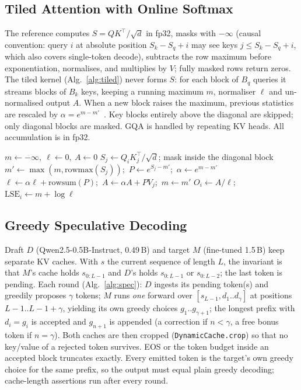 \subsection{Tiled Attention with Online Softmax}\label{sec:attn}
The reference computes $S=QK^\top/\sqrt{d}$ in fp32, masks with $-\infty$ (causal convention: query $i$ at
absolute position $S_k-S_q+i$ may see keys $j\le S_k-S_q+i$, which also covers single-token decode), subtracts the
row maximum before exponentiation, normalises, and multiplies by $V$; fully masked rows return zeros. The
tiled kernel (Alg.~\ref{alg:tiled}) never forms $S$: for each block of $B_q$ queries it streams blocks of $B_k$
keys, keeping a running maximum $m$, normaliser $\ell$ and un-normalised output $A$. When a new block raises
the maximum, previous statistics are rescaled by $\alpha=e^{m-m'}$~\cite{milakov2018online,dao2022flashattention}.
Key blocks entirely above the diagonal are skipped; only diagonal blocks are masked. GQA is handled by
repeating KV heads. All accumulation is in fp32.

\begin{algorithm}[t]
\caption{Tiled attention with online softmax (one query block)}\label{alg:tiled}
\begin{algorithmic}[1]
\State $m\gets-\infty,\ \ell\gets0,\ A\gets0$ 
  \State $S_j\gets Q_iK_j^\top/\sqrt d$; mask inside the diagonal block
  \State $m'\gets\max(m,\mathrm{rowmax}(S_j))$;\ $P\gets e^{S_j-m'}$;\ $\alpha\gets e^{m-m'}$
  \State $\ell\gets\alpha\ell+\mathrm{rowsum}(P)$;\ $A\gets\alpha A+PV_j$;\ $m\gets m'$
\EndFor
\State $O_i\gets A/\ell$;\quad $\mathrm{LSE}_i\gets m+\log\ell$
\end{algorithmic}
\end{algorithm}

\subsection{Greedy Speculative Decoding}\label{sec:spec}
Draft $D$ (Qwen2.5-0.5B-Instruct, 0.49\,B) and target $M$ (fine-tuned 1.5\,B) keep separate KV caches. With
$s$ the current sequence of length $L$, the invariant is that $M$'s cache holds $s_{0:L-1}$ and $D$'s holds
$s_{0:L-1}$ or $s_{0:L-2}$; the last token is pending. Each round (Alg.~\ref{alg:spec}): $D$ ingests its pending
token(s) and greedily proposes $\gamma$ tokens; $M$ runs \emph{one} forward over $[s_{L-1}, d_1..d_\gamma]$ at
positions $L{-}1..L{-}1{+}\gamma$, yielding its own greedy choices $g_1..g_{\gamma+1}$; the longest prefix with
$d_i=g_i$ is accepted and $g_{n+1}$ is appended (a correction if $n<\gamma$, a free bonus token if $n=\gamma$).
Both caches are then cropped (\texttt{DynamicCache.crop}) so that no key/value of a rejected token survives.
EOS or the token budget inside an accepted block truncates exactly. Every emitted token is the target's own
greedy choice for the same prefix, so the output must equal plain greedy decoding; cache-length assertions run
after every round.

